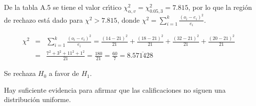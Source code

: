 \begin{solucion}
 \begin{region}
  De la tabla A.5 se tiene el valor cr\'{\i}tico
  $\chi^2_{\alpha,v} = \chi^2_{0.05,3} = 7.815$,
  por lo que la regi\'on de rechazo est\'a dado
  para $\chi^2 > 7.815$, donde
  $\chi^2 = \sum_{i=1}^k \frac{\left( o_i - e_i \right)^2}{e_i}$.
 \end{region}

 \begin{estadistico}
  \begin{eqnarray*}
   \chi^2 & = & \sum_{i=1}^k \frac{\left( o_i - e_i \right)^2}{e_i}
   =\frac{(14 - 21)^2}{21} + \frac{(18 - 21)^2}{21} +
   \frac{(32 - 21)^2}{21} + \frac{(20 - 21)^2}{21} \\
   & = & \frac{7^2 + 3^2 + 11^2 + 1^2}{21} = \frac{180}{21}
   = \frac{60}{7} = 8.\overline{571428}
  \end{eqnarray*}
 \end{estadistico}

 \begin{decision}
  Se rechaza $H_0$ a favor de $H_1$.
 \end{decision}

 \begin{conclusion}
  Hay suficiente evidencia para afirmar que las calificaciones
  no siguen una distribuci\'on uniforme.
 \end{conclusion}


\end{solucion}
